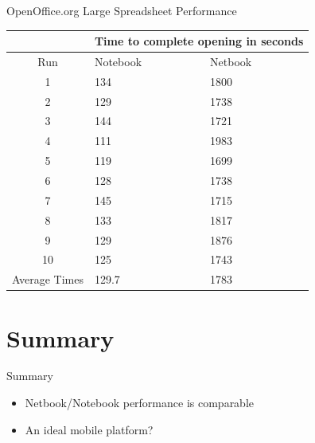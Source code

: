 \documentclass{beamer}
\begin{document}
\begin{frame}{OpenOffice.org Large Spreadsheet Performance}
  \begin{tabularx}{300pt}{| c | X | X |}
    \hline
    & \multicolumn{2}{c|}{Time to complete opening in seconds} \\ \hline
    Run               & Notebook & Netbook    \\ \hline
    1                 & 134      & 1800       \\ \hline
    2                 & 129      & 1738       \\ \hline
    3                 & 144      & 1721       \\ \hline
    4                 & 111      & 1983       \\ \hline
    5                 & 119      & 1699       \\ \hline
    6                 & 128      & 1738       \\ \hline
    7                 & 145      & 1715       \\ \hline
    8                 & 133      & 1817       \\ \hline
    9                 & 129      & 1876       \\ \hline
    10                & 125      & 1743       \\ \hline
    Average Times     & 129.7    & 1783       \\
    \hline
  \end{tabularx}
\end{frame}

\section*{Summary}

\begin{frame}{Summary}

\begin{itemize}
\item Netbook/Notebook performance is comparable
\item An ideal mobile platform?
\end{itemize}

\end{frame}
\end{document}
